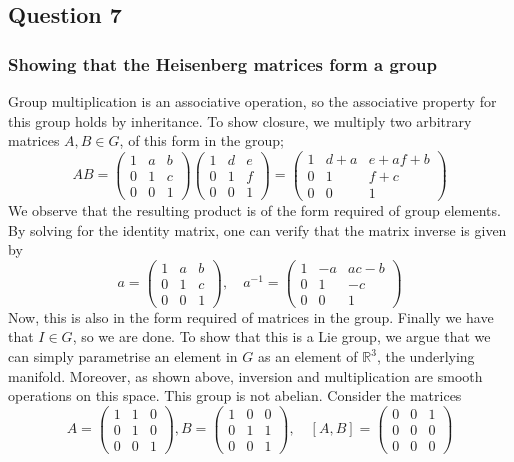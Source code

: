 \subsection{Question 7} 

\subsubsection*{Showing that the Heisenberg matrices form a group} 
Group multiplication is an associative operation, so the associative property for this group holds by inheritance. To show closure, we multiply two arbitrary matrices $A, B \in G$, of this form in the group; 
\[ 
AB =  \begin{pmatrix} 1 & a & b \\ 0 & 1 & c \\ 0 & 0 & 1 \end{pmatrix} \begin{pmatrix} 1 & d & e \\ 0 & 1 & f \\ 0 & 0 & 1 \end{pmatrix}  = 
\begin{pmatrix} 1 & d + a & e + af + b \\ 0 & 1 & f + c \\ 0 & 0 & 1 \end{pmatrix} 
\] We observe that the resulting product is of the form required of group elements. By solving for the identity matrix, one can verify that the matrix inverse is given by 
\[ 
a= \begin{pmatrix} 1 & a & b \\ 0 & 1 & c \\ 0 & 0 & 1 \end{pmatrix}, \quad a^{ - 1}  = \begin{pmatrix} 1 & -a & ac - b \\ 0 & 1 & -c \\ 0 & 0 & 1 \end{pmatrix} 
\] Now, this is also in the form required of matrices in the group. Finally we have that $I \in G$, so we are done. To show that this is a Lie group, we argue that we can simply parametrise an element in $G$ as an element of $\mathbb{ R}^3 $, the underlying manifold. Moreover, as shown above, inversion and multiplication are smooth operations on this space. This group is not abelian. Consider the matrices
\[ 
A = \begin{pmatrix} 1 & 1 & 0 \\ 0 & 1 & 0 \\ 0 & 0 & 1 \end{pmatrix}, B = \begin{pmatrix} 1 & 0 & 0 \\ 0 & 1 & 1 \\ 0 & 0 & 1 \end{pmatrix}, \quad [ A , B ] = \begin{pmatrix} 0 & 0 & 1 \\ 0 & 0 & 0 \\ 0 & 0 & 0 \end{pmatrix} 
\] 
